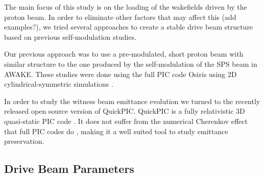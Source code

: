 \documentclass[aps,prstab,reprint,amsmath,amssymb,groupedaddress]{revtex4-1}
\begin{document}
The main focus of this study is on the loading of the wakefields driven by the proton beam. In order to eliminate other
factors that may affect this (add examples?), we tried several approaches to create a stable drive beam structure based
on previous self-modulation studies.

Our previous approach was to use a pre-modulated, short proton beam with similar structure to the one produced by the
self-modulation of the SPS beam in AWAKE. These studies were done using the full PIC code Osiris \cite{fonseca:2002}
using 2D cylindrical-symmetric simulations \cite{berglyd_olsen:2015, berglyd_olsen:2016}.


In order to study the witness beam emittance evolution we turned to the recently released open source version of
QuickPIC. QuickPIC is a fully relativistic 3D quasi-static PIC code \cite{huang:2006, an:2013}. It does not suffer from
the numerical Cherenkov effect that full PIC codes do \cite{godfrey:1974,lehe:2013}, making it a well suited tool to
study emittance preservation.

\subsection{Drive Beam Parameters}\label{S:M:Setup}
\end{document}
